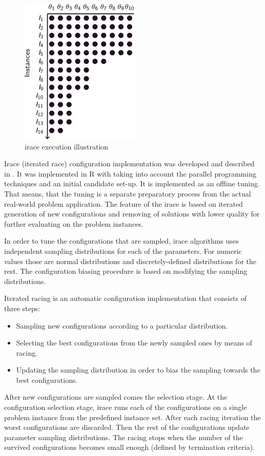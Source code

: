 \documentclass[11pt,a4paper,oneside]{book}
\begin{document}
\begin{figure}
  \centering
    \includegraphics{irace.jpg}
  \caption{irace execution illustration}
  \label{fig:irace}
\end{figure}


Irace (iterated race) configuration implementation was developed and described in \cite{LopDubStuBir2011:techreport-004}. It was implemented in R with taking into account the parallel programming techniques and an initial candidate set-up. It is implemented as an offline tuning. That means, that the tuning is a separate preparatory process from the actual real-world problem application. The feature of the irace is based on iterated generation of new configurations and removing of solutions with lower quality for further evaluating on the problem instances.

In order to tune the configurations that are sampled, irace algorithms uses independent sampling distributions for each of the parameters. For numeric values those are normal distributions and discretely-defined distributions for the rest. The configuration biasing procedure is based on modifying the sampling distributions.

Iterated racing is an automatic configuration implementation that consists of three steps:

\begin{itemize}
\item Sampling new configurations according to a particular distribution.
\item Selecting the best configurations from the newly sampled ones by means of racing.
\item Updating the sampling distribution in order to bias the sampling towards the best configurations.
\end{itemize}

After new configurations are sampled comes the selection stage. At the configuration selection stage, irace runs each of the configurations on a single problem instance from the predefined instance set. After each racing iteration the worst configurations are discarded. Then the rest of the configurations update parameter sampling distributions. The racing stops when the number of the survived configurations becomes small enough (defined by termination criteria).
\end{document}

